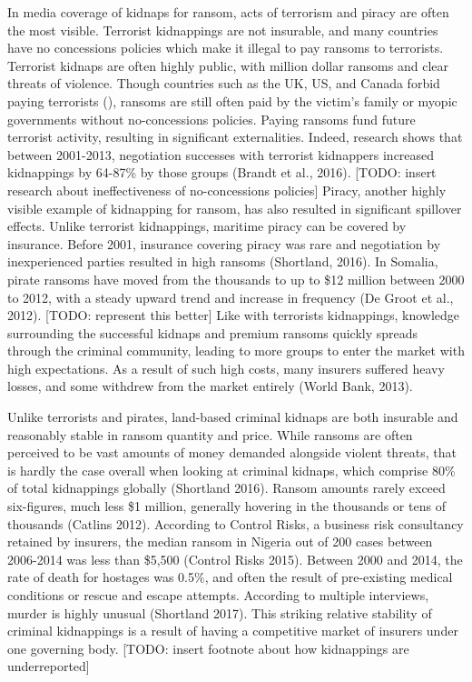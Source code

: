 \documentclass[12pt]{article}
\begin{document}
In media coverage of kidnaps for ransom, acts of terrorism and piracy are often the most visible. Terrorist kidnappings are not insurable, and many countries have no concessions policies which make it illegal to pay ransoms to terrorists. Terrorist kidnaps are often highly public, with million dollar ransoms and clear threats of violence. Though countries such as the UK, US, and Canada forbid paying terrorists (), ransoms are still often paid by the victim's family or myopic governments without no-concessions policies. Paying ransoms fund future terrorist activity, resulting in significant externalities. Indeed, research shows that between 2001-2013, negotiation successes with terrorist kidnappers increased kidnappings by 64-87\% by those groups (Brandt et al., 2016). [TODO: insert research about ineffectiveness of no-concessions policies] Piracy, another highly visible example of kidnapping for ransom, has also resulted in significant spillover effects. Unlike terrorist kidnappings, maritime piracy can be covered by insurance. Before 2001, insurance covering piracy was rare and negotiation by inexperienced parties resulted in high ransoms (Shortland, 2016). In Somalia, pirate ransoms have moved from the thousands to up to \$12 million between 2000 to 2012, with a steady upward trend and increase in frequency (De Groot et al., 2012). [TODO: represent this better] Like with terrorists kidnappings, knowledge surrounding the successful kidnaps and premium ransoms quickly spreads through the criminal community, leading to more groups to enter the market with high expectations. As a result of such high costs, many insurers suffered heavy losses, and some withdrew from the market entirely (World Bank, 2013).

Unlike terrorists and pirates, land-based criminal kidnaps are both insurable and reasonably stable in ransom quantity and price. While ransoms are often perceived to be vast amounts of money demanded alongside violent threats, that is hardly the case overall when looking at criminal kidnaps, which comprise 80\% of total kidnappings globally (Shortland 2016). Ransom amounts rarely exceed six-figures, much less \$1 million, generally hovering in the thousands or tens of thousands (Catlins 2012). According to Control Risks, a business risk consultancy retained by insurers, the median ransom in Nigeria out of 200 cases between 2006-2014 was less than \$5,500 (Control Risks 2015). Between 2000 and 2014, the rate of death for hostages was 0.5\%, and often the result of pre-existing medical conditions or rescue and escape attempts. According to multiple interviews, murder is highly unusual (Shortland 2017). This striking relative stability of criminal kidnappings is a result of having a competitive market of insurers under one governing body. [TODO: insert footnote about how kidnappings are underreported] 
\end{document}
